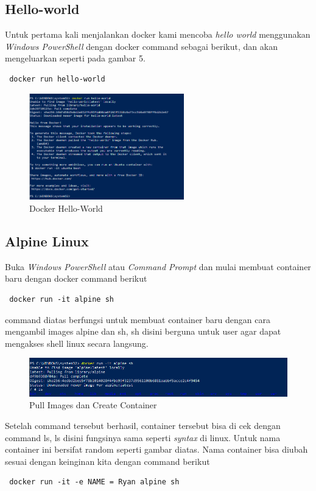 \documentclass[11pt,a4paper]{article}
\begin{document}
 \subsection{Hello-world}
 Untuk pertama kali menjalankan docker kami mencoba \textit{hello world} menggunakan \textit{Windows PowerShell} dengan docker command sebagai berikut, dan akan mengeluarkan seperti pada gambar 5.
 \begin{lstlisting}
 docker run hello-world\end{lstlisting}
 \begin{figure}[h]
     \centering
     \includegraphics[width=0.6\textwidth]{Figure/6, helloworld.png}
     \caption{Docker Hello-World}
 \end{figure}
 \subsection{Alpine Linux}
 Buka \textit{Windows PowerShell} atau \textit{Command Prompt} dan mulai membuat container baru dengan docker command berikut
 \begin{lstlisting}
 docker run -it alpine sh\end{lstlisting}
 command diatas berfungsi untuk membuat container baru dengan cara mengambil images alpine dan sh, sh disini berguna untuk user agar dapat mengakses shell linux secara langsung.
 \begin{figure}[h]
     \centering
     \includegraphics[width=1\textwidth]{Figure/7. create container.png}
     \caption{Pull Images dan Create Container}
 \end{figure}
 \newline
 Setelah command tersebut berhasil, container tersebut bisa di cek dengan command ls, ls disini fungsinya sama seperti \textit{syntax} di linux. Untuk nama container ini bersifat random seperti gambar diatas. Nama container bisa diubah sesuai dengan keinginan kita dengan command berikut
 \begin{lstlisting}
 docker run -it -e NAME = Ryan alpine sh\end{lstlisting}
 \newpage
\end{document}
